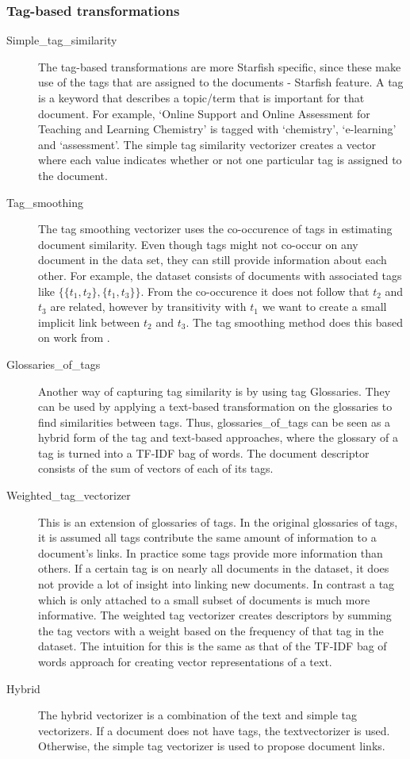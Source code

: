 \subsubsection{Tag-based transformations}
\begin{description}
\item[Simple\_tag\_similarity] The tag-based transformations are more Starfish specific, since these make use of the tags that are assigned to the documents - Starfish feature. A tag is a keyword that describes a topic/term that is important for that document. For example, `Online Support and Online Assessment for Teaching and Learning Chemistry' is tagged with `chemistry', `e-learning' and `assessment'. The simple tag similarity vectorizer creates a vector where each value indicates whether or not one particular tag is assigned to the document. 

\item [Tag\_smoothing] The tag smoothing vectorizer uses the co-occurence of tags in estimating document similarity. Even though tags might not co-occur on any document in the data set, they can still provide information about each other. For example, the dataset consists of documents with associated tags like $\{\{t_1, t_2\}, \{t_1, t_3\}\}$. From the co-occurence it does not follow that $t_2$ and $t_3$ are related, however by transitivity with $t_1$ we want to create a small implicit link between $t_2$ and $t_3$. The tag smoothing method does this based on work from \citet{zhou2011web}.

\item [Glossaries\_of\_tags] Another way of capturing tag similarity is by using tag Glossaries. They can be used by applying a text-based transformation on the glossaries to find similarities between tags. Thus, glossaries\_of\_tags can be seen as a hybrid form of the tag and text-based approaches, where the glossary of a tag is turned into a TF-IDF bag of words. The document descriptor consists of the sum of vectors of each of its tags. 

\item [Weighted\_tag\_vectorizer] This is an extension of glossaries of tags.
  In the original glossaries of tags, it is assumed all tags contribute the
  same amount of information to a document's links. In practice some tags
  provide more information than others. If a certain tag is on nearly all
  documents in the dataset, it does not provide a lot of insight into linking
  new documents. In contrast a tag which is only attached to a small subset of
  documents is much more informative. The weighted tag vectorizer creates
  descriptors by summing the tag vectors with a weight based on the frequency
  of that tag in the dataset. The intuition for this is the same as that
  of the TF-IDF bag of words approach for creating vector representations
  of a text.

\item [Hybrid] The hybrid vectorizer is a combination of the text and simple tag vectorizers. If a document does not have tags, the textvectorizer is used. Otherwise, the simple tag vectorizer is used to propose document links.
\end{description}

